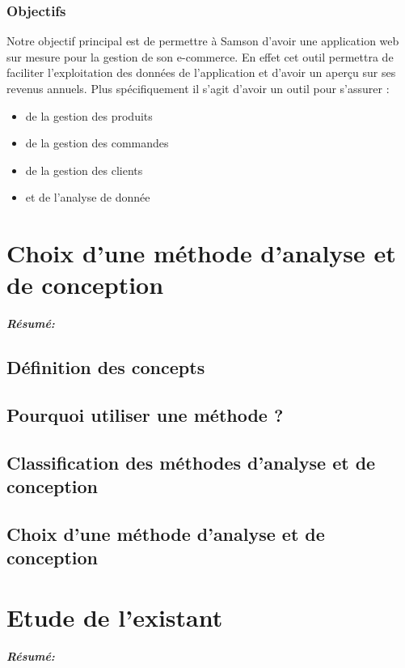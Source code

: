 \documentclass[a4paper, 12pt]{report}
\begin{document}
\subsection{Objectifs}
{Notre objectif principal est de permettre à Samson d’avoir une application web sur mesure pour la gestion de son e-commerce. En effet cet outil permettra de faciliter l’exploitation des données de l’application et d’avoir un aperçu sur ses revenus annuels. Plus spécifiquement il s’agit d’avoir un outil pour s’assurer :
\begin{itemize}
  \item de la gestion des produits 
  \item de la gestion des commandes
  \item de la gestion des clients
  \item et de l'analyse de donnée
\end{itemize} 
}



\chapter{ Choix d'une méthode d'analyse et de conception }
\textit{\textbf{Résumé:} }
\setcounter{minitocdepth}{1}
\minitoc

\section{Définition des concepts}

\section{Pourquoi utiliser  une méthode ?}

\section{Classification des méthodes d'analyse et de conception}

\section{Choix d'une méthode  d'analyse et de conception}



\chapter{ Etude de l'existant }
\textit{\textbf{Résumé:} }
\setcounter{minitocdepth}{1}
\minitoc
\end{document}

